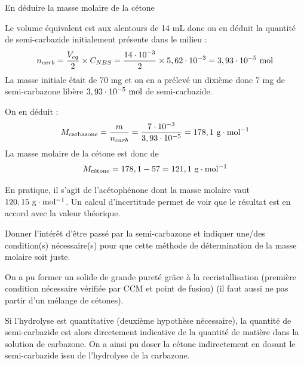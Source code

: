 \documentclass[twoside,a4paper,11pt,answers]{exam}
\begin{document}
\begin{questions}
\begin{framed}
\question En déduire la masse molaire de la cétone
\begin{solution}[7cm]
Le volume équivalent est aux alentours de 14 mL donc on en déduit la quantité de semi-carbazide initialement présente dans le milieu :
\begin{align}
n_{carb}=\dfrac{V_{eq}}{2}\times C_{NBS}=\dfrac{14\cdot 10^{-3}}{2}\times 5,62\cdot 10^{-3}=3,93\cdot 10^{-5}~\mathrm{mol}
\end{align}
La masse initiale était de 70 mg et on en a prélevé un dixième donc 7 mg de semi-carbazone libère $3,93\cdot 10^{-5}~\mathrm{mol}$ de semi-carbazide. 

On en déduit :
\begin{align}
M_{\text{carbazone}}=\dfrac{m}{n_{carb}}=\dfrac{7\cdot 10^{-3}}{3,93\cdot 10^{-5}}=178,1~\mathrm{g\cdot mol^{-1}}
\end{align}
La masse molaire de la cétone est donc de 
\begin{align}
M_{\text{cétone}}=178,1-57 = 121,1 ~\mathrm{g\cdot mol^{-1}}
\end{align}


En pratique, il s'agit de l'acétophénone dont la masse molaire vaut $120,15~\mathrm{g\cdot mol^{-1}}$. Un calcul d'incertitude permet de voir que le résultat est en accord avec la valeur théorique.
\end{solution}
\end{framed}

\begin{framed}
\question Donner l'intérêt d'être passé par la semi-carbazone et indiquer une/des condition(s) nécessaire(s) pour que cette méthode de détermination de la masse molaire soit juste.
\begin{solution}[3cm]
On a pu former un solide de grande pureté grâce à la recristallisation (première condition nécessaire vérifiée par CCM et point de fusion) (il faut aussi ne pas partir d'un mélange de cétones).

Si l'hydrolyse est quantitative (deuxième hypothèse nécessaire), la quantité de semi-carbazide est alors directement indicative de la quantité de matière dans la solution de carbazone. On a ainsi pu doser la cétone indirectement en dosant le semi-carbazide issu de l'hydrolyse de la carbazone.
\end{solution}
\end{framed}


\end{questions}
\end{document}
